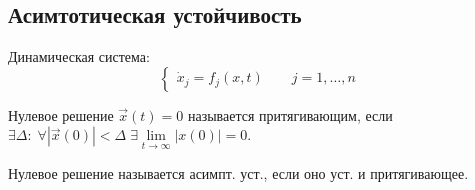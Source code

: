 \documentclass{article}
\begin{document}
\subsection{Асимтотическая устойчивость}
Динамическая система:
\[
  \left\{\begin{aligned}
    \dot{x}_j=f_j(x,t) \qquad j=1,\dots ,n
  \end{aligned}\right.
\]
\begin{definition}
  Нулевое решение $\vec{x}(t)=0$ называется притягивающим,
  если $\exists \Delta: \; \forall |\vec{x}(0)|<\Delta \; \exists \lim \limits_{t\to\infty}|x(0)|=0$.
\end{definition}
\begin{definition}
  Нулевое решение называется асимпт. уст., если оно уст. и притягивающее.
\end{definition}
\end{document}
